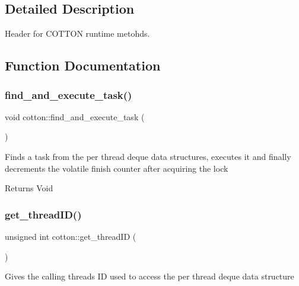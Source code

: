 \subsection{Detailed Description}
Header for C\+O\+T\+T\+ON runtime metohds. 



\subsection{Function Documentation}
\mbox{\label{cotton-runtime_8h_file_af22caee9434a7e06a09b2f9a0417c1eb}} 
\subsubsection{\texorpdfstring{find\+\_\+and\+\_\+execute\+\_\+task()}{find\_and\_execute\_task()}}
{\footnotesize\ttfamily void cotton\+::find\+\_\+and\+\_\+execute\+\_\+task (\begin{DoxyParamCaption}{ }\end{DoxyParamCaption})}

Finds a task from the per thread deque data structures, executes it and finally decrements the volatile finish counter after acquiring the lock

\begin{DoxyReturn}{Returns}
Void 
\end{DoxyReturn}
\mbox{\label{cotton-runtime_8h_file_ab1ebe1f6821a54e7c4911c22acebff8a}} 
\subsubsection{\texorpdfstring{get\+\_\+thread\+I\+D()}{get\_threadID()}}
{\footnotesize\ttfamily unsigned int cotton\+::get\+\_\+thread\+ID (\begin{DoxyParamCaption}{ }\end{DoxyParamCaption})}

Gives the calling thread\textquotesingle{}s ID used to access the per thread deque data structure

